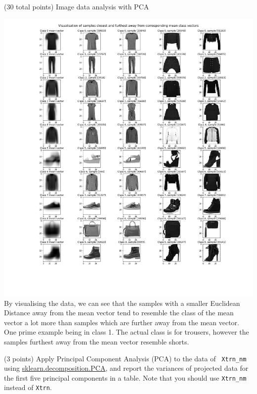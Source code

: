 \documentclass[12pt]{article}
\begin{document}
\begin{question}{(30 total points) Image data analysis with PCA}
\begin{subquestion}
  \begin{answerbox}{52em}
    \includegraphics[width = 1.0\textwidth]{q1_2.png}
    By visualising the data, we can see that the samples with a smaller Euclidean Distance away from the mean vector tend to resemble the class of the mean vector a lot more than samples which are further away from the mean vector. One prime example being in class 1. The actual class is for trousers, however the samples furthest away from the mean vector resemble shorts.
  \end{answerbox}



   \end{subquestion}

   \begin{subquestion}{(3 points)
       Apply Principal Component Analysis (PCA) to the data of {\tt
         Xtrn\_nm} using
       \href{https://scikit-learn.org/0.19/modules/generated/sklearn.decomposition.PCA.html}{sklearn.decomposition.PCA},
       and report the variances of projected data for the first five principal
       components in a table. 
       Note that you should use {\tt Xtrn\_nm} instead of {\tt Xtrn}.
           } \label{Q1.pca.variance}




\end{subquestion}
\end{question}
\end{document}
